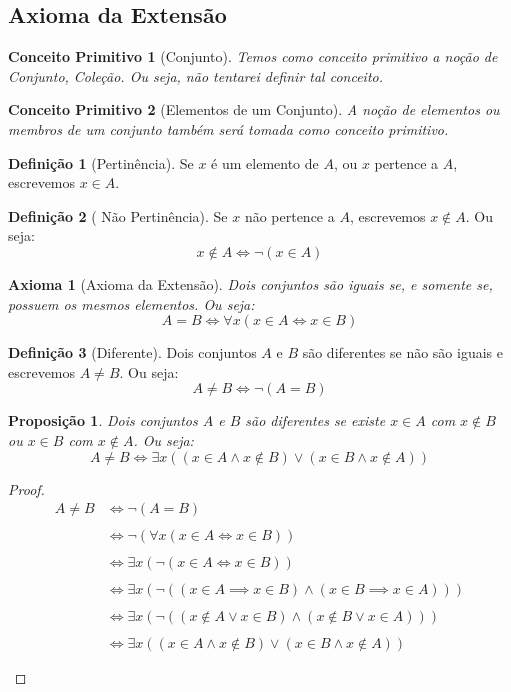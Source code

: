 \documentclass{article}
\newtheorem{axioma}{Axioma}
\newtheorem{conceitoPrimitivo}{Conceito Primitivo}
\newtheorem{prop}{Proposição}[section]
\theoremstyle{theorem}
\theoremstyle{lemma}
\theoremstyle{definition}
\newtheorem{definicao}{Definição}[section]
\theoremstyle{remark}
\begin{document}
\subsection{Axioma da Extensão}
\begin{conceitoPrimitivo}[Conjunto]
	Temos como conceito primitivo a noção de Conjunto, Coleção. Ou seja, não tentarei definir tal conceito.
\end{conceitoPrimitivo}
\begin{conceitoPrimitivo}[Elementos de um Conjunto]
	A noção de elementos ou membros de um conjunto também será tomada como conceito primitivo.
\end{conceitoPrimitivo}
\begin{definicao}[Pertinência]
	Se $x$ é um elemento de $A$, ou $x$ pertence a $A$, escrevemos $x\in A$.
\end{definicao}
\begin{definicao}[ Não Pertinência]
	Se $x$ não pertence a $A$, escrevemos $x \not \in A$. Ou seja:
	$$x \not \in A \iff \neg (x\in A)$$
\end{definicao}
\begin{axioma}[Axioma da Extensão]
	Dois conjuntos são iguais se, e somente se, possuem os mesmos elementos. Ou seja: 
	$$ A = B \iff \forall x ( x\in A \iff x \in B) $$
\end{axioma}
\begin{definicao}[Diferente]
	Dois conjuntos $A$ e $B$ são diferentes se não são iguais e escrevemos $A\neq B$. Ou seja:
	$$A\neq B \iff \neg (A = B)$$
\end{definicao}
\begin{prop}
	Dois conjuntos $A$ e $B$  são diferentes se existe $x\in A$ com $x\not \in B $ ou $x\in B$ com $x\not \in A$. Ou seja:
	$$A \neq B \iff \exists x ( ( x\in A \land x\not \in B) \lor (x\in B  \land x\not \in A))$$
\end{prop}
\begin{proof}
	\begin{align*}
		A\neq B &\iff \neg (A = B) \\~\\
		&\iff \neg (\forall x ( x\in A \iff x \in B)) \\~\\
		&\iff \exists x ( \neg ( x\in A \iff x \in B)) \\~\\
		&\iff \exists x ( \neg (( x\in A \implies x \in B) \land (x\in B \implies x\in A))) \\~\\
		&\iff \exists x ( \neg ((  x\not\in A \lor x\in B) \land ( x\not\in B \lor x\in A))) \\~\\
		&\iff \exists x ( (  x\in A \land x\not\in B) \lor ( x\in B \land x\not \in A)) \\~\\
	\end{align*}
\end{proof}
\end{document}
